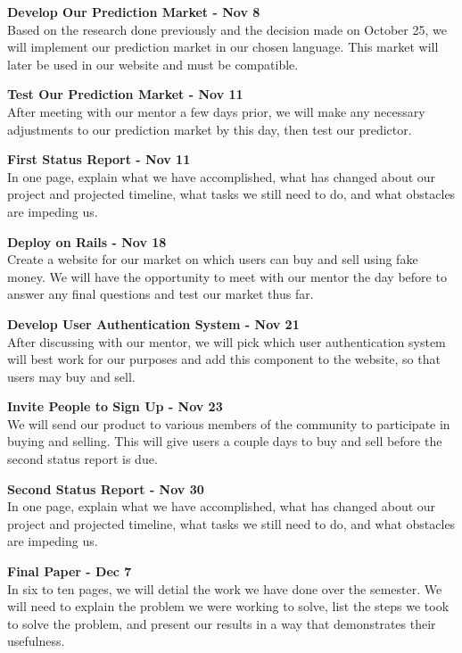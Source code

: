 \documentclass[12pt]{article}
\begin{document}
\noindent
\textbf{Develop Our Prediction Market - Nov 8} \\
Based on the research done previously and the decision made on October 25, we will implement our prediction market in our chosen language. This market will later be used in our website and must be compatible.

\noindent
\textbf{Test Our Prediction Market - Nov 11} \\
After meeting with our mentor a few days prior, we will make any necessary adjustments to our prediction market by this day, then test our predictor.

\noindent
\textbf{First Status Report - Nov 11} \\
In one page, explain what we have accomplished, what has changed about our project
and projected timeline, what tasks we still need to do, and what obstacles
are impeding us.

\noindent
\textbf{Deploy on Rails - Nov 18} \\
Create a website for our market on which users can buy and sell using fake money. We will have the opportunity to meet with our mentor the day before to answer any final questions and test our market thus far.

\noindent
\textbf{Develop User Authentication System - Nov 21} \\
After discussing with our mentor, we will pick which user authentication system will best work for our purposes and add this component to the website, so that users may buy and sell. 

\noindent
\textbf{Invite People to Sign Up - Nov 23} \\
We will send our product to various members of the community to participate in buying and selling. This will give users a couple days to buy and sell before the second status report is due.

\noindent
\textbf{Second Status Report - Nov 30} \\
In one page, explain what we have accomplished, what has changed about our project
and projected timeline, what tasks we still need to do, and what obstacles
are impeding us.

\noindent
\textbf{Final Paper - Dec 7} \\
In six to ten pages, we will detial the work we have done over the semester. We
will need to explain the problem we were working to solve, list the steps
we took to solve the problem, and present our results in a way that 
demonstrates their usefulness.
\end{document}

